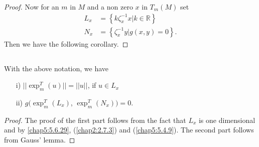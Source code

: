 \begin{proof}
Now for an $m$ in $M$ and a non zero $x$ in $T_{m}(M)$ set
\begin{align*}
L_{x} &=
\left\{k\zeta^{-1}_{x}x|k\in\mathbb{R}\right\}\tag{5.6.30}\label{chap5:5.6.30}\\
N_{x} &= \left\{\zeta^{-1}_{x}y|g(x,y)=0\right\}.\tag{5.6.31}\label{chap5:5.6.31}
\end{align*}
Then we have the following corollary.
\end{proof}

\setcounter{subsection}{31}

\subsection{}\label{chap5:5.6.32}

\begin{coro*}
With the above notation, we have
\begin{itemize}
\item[\rm i)] $||\exp^{T}_{m}(u)||=||u||$, if $u\in L_{x}$

\item[\rm ii)] $g(\exp^{T}_{m}(L_{x})$, $\exp^{T}_{m}(N_{x}))=0$.
\end{itemize}
\end{coro*}

\begin{proof}
The proof of the first part follows from the fact that $L_{x}$ is one
dimensional and by \eqref{chap5:5.6.29}, (\ref{chap2:2.7.3}) and
(\ref{chap5:5.4.9}). The second part follows from Gauss' lemma.
\end{proof}
